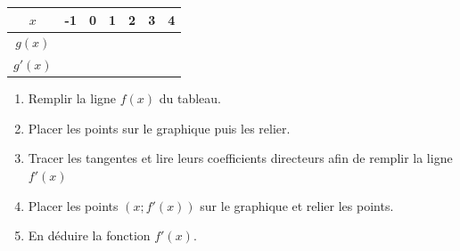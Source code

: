 \documentclass[11pt]{article}
\begin{document}
\begin{center}
  \begin{tabular}{| c | c | c | c | c | c | c | }
    \hline
    $x$     & -1               & 0                & 1                & 2                & 3                & 4\\
    \hline
    $g(x)$  & \phantom{123456} & \phantom{123456} & \phantom{123456} & \phantom{123456} & \phantom{123456} & \phantom{123456} \\
    \hline
    $g'(x)$ & \phantom{123456} & \phantom{123456} & \phantom{123456} & \phantom{123456} & \phantom{123456} & \phantom{123456}  \\
    \hline
  \end{tabular}
\end{center}

\begin{enumerate}
\item Remplir la ligne $f(x)$ du tableau.
\item Placer les points sur le graphique puis les relier.
\item Tracer les tangentes et lire leurs coefficients directeurs afin de remplir la ligne $f'(x)$
\item Placer les points $(x ; f'(x))$ sur le graphique et relier les points.
\item En déduire la fonction $f'(x)$.
\end{enumerate}
\end{document}
